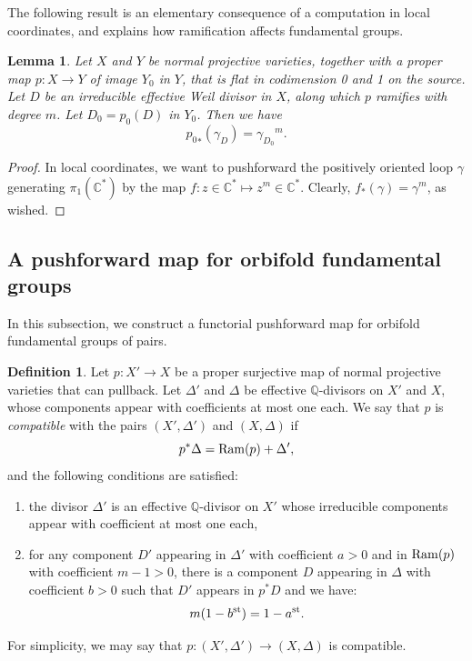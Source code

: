 \documentclass{amsart}
\newtheorem{lemma}[theorem]{Lemma}
\theoremstyle{definition}
\newtheorem{definition}[theorem]{Definition}
\theoremstyle{remark}
\numberwithin{equation}{section}
\begin{document}
The following result is an elementary consequence of a computation in local coordinates, and explains how ramification affects fundamental groups.

\begin{lemma}
    Let $X$ and $Y$ be normal projective varieties, together with a proper map $p:X\to Y$ of image $Y_0$ in $Y$, that is flat in codimension 0 and 1 on the source. Let $D$ be an irreducible effective Weil divisor in $X$, along which $p$ ramifies with degree $m$. Let $D_0 = p_0(D)$ in $Y_0$. 
    Then we have $${p_0}_*(\gamma_D)={\gamma_{D_0}}^m.$$
\end{lemma}

\begin{proof}
    In local coordinates, we want to pushforward the positively oriented loop $\gamma$ generating $\pi_1(\mathbb{C}^*)$ by the map $f:z\in\mathbb{C}^* \mapsto z^m\in\mathbb{C}^*$. Clearly, $f_*(\gamma)=\gamma^m$, as wished.
\end{proof}

\subsection{A pushforward map for orbifold fundamental groups}

In this subsection, we construct a functorial pushforward map for orbifold fundamental groups of pairs.

\begin{definition}\label{def:compatible_annex}    
Let $p:X'\to X$ be a proper surjective map of normal projective varieties that can pullback. Let $\Delta'$ and $\Delta$ be effective $\mathbb{Q}$-divisors on $X'$ and $X$, whose components appear with coefficients at most one each.
We say that $p$ is \emph{compatible} with the pairs $(X',\Delta')$ and $(X,\Delta)$ if
    $$p^*\Delta={\rm Ram}(p)+\Delta',$$
    and the following conditions are satisfied:
    \begin{enumerate}
        \item the divisor $\Delta'$ is an effective $\mathbb{Q}$-divisor on $X'$ whose irreducible components appear with coefficient at most one each,
        \item for any component $D'$ appearing in $\Delta'$ with coefficient $a>0$ and in ${\rm Ram}(p)$ with coefficient $m-1>0$, there is a component $D$ appearing in $\Delta$ with coefficient $b>0$ such that $D'$ appears in $p^*D$ and we have:
        $$m(1-b^{\rm st})=1-a^{\rm st}.$$
    \end{enumerate}

\noindent 
For simplicity, we may say that 
$p\colon (X',\Delta')\rightarrow (X,\Delta)$ is compatible. 
\end{definition}
\end{document}
